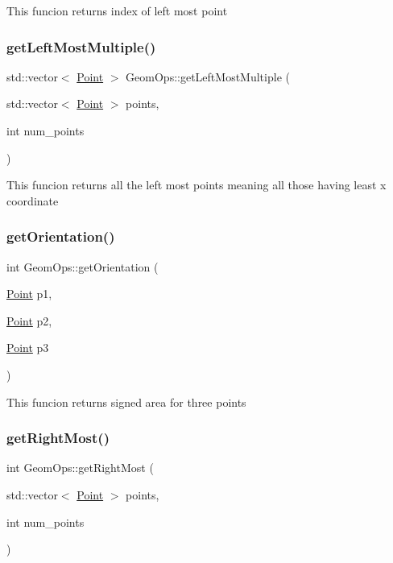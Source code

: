 This funcion returns index of left most point \mbox{\label{classGeomOps_abecf90c2d943a31d42767dad3f7e1c9e}} 
\subsubsection{\texorpdfstring{get\+Left\+Most\+Multiple()}{getLeftMostMultiple()}}
{\footnotesize\ttfamily std\+::vector$<$ \hyperlink{classPoint}{Point} $>$ Geom\+Ops\+::get\+Left\+Most\+Multiple (\begin{DoxyParamCaption}\item[{std\+::vector$<$ \hyperlink{classPoint}{Point} $>$}]{points,  }\item[{int}]{num\+\_\+points }\end{DoxyParamCaption})}

This funcion returns all the left most points meaning all those having least x coordinate \mbox{\label{classGeomOps_af0c9873799ec28ec6a4196c181bc5942}} 
\subsubsection{\texorpdfstring{get\+Orientation()}{getOrientation()}}
{\footnotesize\ttfamily int Geom\+Ops\+::get\+Orientation (\begin{DoxyParamCaption}\item[{\hyperlink{classPoint}{Point}}]{p1,  }\item[{\hyperlink{classPoint}{Point}}]{p2,  }\item[{\hyperlink{classPoint}{Point}}]{p3 }\end{DoxyParamCaption})}

This funcion returns signed area for three points \mbox{\label{classGeomOps_adfa6200d7fd59612b2adce1c5ce6b291}} 
\subsubsection{\texorpdfstring{get\+Right\+Most()}{getRightMost()}}
{\footnotesize\ttfamily int Geom\+Ops\+::get\+Right\+Most (\begin{DoxyParamCaption}\item[{std\+::vector$<$ \hyperlink{classPoint}{Point} $>$}]{points,  }\item[{int}]{num\+\_\+points }\end{DoxyParamCaption})}

